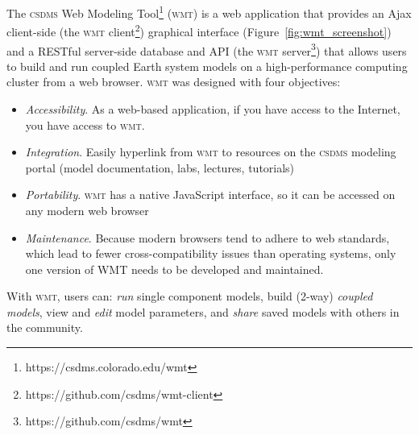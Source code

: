 \documentclass[11pt, oneside]{amsart}
\DeclareRobustCommand{\csdms}{\textsc{csdms}}
\DeclareRobustCommand{\wmt}{\textsc{wmt}}
\begin{document}
The \csdms{} Web Modeling Tool\footnote{https://csdms.colorado.edu/wmt}
(\wmt{}) is a web
application that provides an Ajax client-side (the \wmt{}
client\footnote{https://github.com/csdms/wmt-client}) graphical interface
(Figure~\ref{fig:wmt_screenshot}) and a RESTful
server-side database and API (the \wmt{} server\footnote{https://github.com/csdms/wmt}) that allows users to build and run coupled Earth system models on
a high-performance computing cluster from a web browser. \wmt{} was designed
with four objectives:
\begin{itemize}

\item \emph{Accessibility}. As a web-based application, if you have access
      to the Internet, you have access to \wmt{}.

\item \emph{Integration}. Easily hyperlink from \wmt{} to resources on the 
      \csdms{} modeling portal (model documentation, labs, lectures,
      tutorials)

\item \emph{Portability}. \wmt{} has a native JavaScript interface, so it can
      be accessed on any modern web browser

\item \emph{Maintenance}. Because modern browsers tend to adhere to web
      standards, which lead to fewer cross-compatibility issues than
      operating systems, only one version of WMT needs to be developed
      and maintained.

\end{itemize}
With \wmt{}, users can: \emph{run} single component models, build (2-way)
\emph{coupled models}, view and \emph{edit} model parameters, and \emph{share}
saved models with others in the community.

\end{document}
